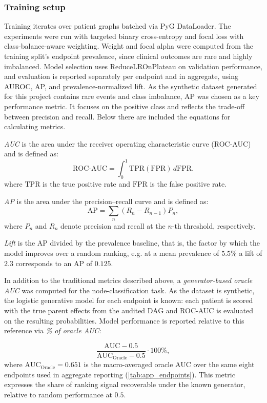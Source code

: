 \subsubsection{Training setup}

Training iterates over patient graphs batched via PyG DataLoader. The experiments were run with
targeted binary cross-entropy and focal loss with class-balance-aware weighting. 
Weight and focal alpha were computed from the training split's endpoint prevalence, since clinical outcomes
are rare and highly imbalanced. Model selection uses ReduceLROnPlateau on validation performance, and 
evaluation is reported separately per endpoint and in aggregate, using AUROC, AP, and prevalence-normalized 
lift.
 As the synthetic dataset generated for this project contains
 rare events and class imbalance, AP was chosen as a key performance
 metric. It focuses on the positive class and reflects the trade-off
 between precision and recall. Below there are included the equations for calculating metrics.
 
 \emph{AUC} is the area under the receiver operating characteristic curve (ROC-AUC) 
 and is defined as:
 \begin{equation}
   \mathrm{ROC\mbox{-}AUC}
   =
   \int_0^1 \mathrm{TPR}(\mathrm{FPR})\,d\mathrm{FPR}.
   \end{equation}
   where $\mathrm{TPR}$ is the true positive rate and $\mathrm{FPR}$ is the false positive rate.
 
 \emph{AP} is the area under the precision--recall curve and is defined as:
 \begin{equation}
   \mathrm{AP} =
   \sum_{n}
   \left(R_n - R_{n-1}\right) P_n,
   \end{equation}
   where $P_n$ and $R_n$ denote precision and recall at the $n$-th threshold,
   respectively.
 
 \emph{Lift} is the AP divided by the prevalence baseline, that is, the
 factor by which the model improves over a random ranking, e.g. at a mean
 prevalence of $5.5\%$ a lift of $2.3$ corresponds to an AP of $0.125$.
 
 In addition to the traditional metrics described above, a
 \emph{generator-based oracle AUC} was computed for the node-classification
 task. As the dataset is synthetic, the logistic generative model for
 each endpoint is known: each patient is scored with the true parent effects
 from the audited DAG and ROC-AUC is evaluated on the resulting
 probabilities. Model performance is reported relative to this reference via
 \emph{\% of oracle AUC}:
 
 \begin{equation}
   \frac{\mathrm{AUC} - 0.5}{\mathrm{AUC}_{\mathrm{Oracle}} - 0.5} \cdot 100\%,
   \label{eq:pct-ceiling}
 \end{equation}
 where $\mathrm{AUC}_{\mathrm{Oracle}} = 0.651$ is the macro-averaged oracle
 AUC over the same eight endpoints used in aggregate reporting
 (\cref{tab:app_endpoints}). This metric expresses the share of ranking
 signal recoverable under the known generator, relative to random performance
 at $0.5$. 
 
 
 